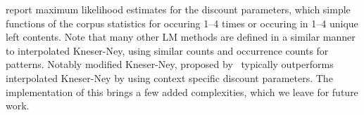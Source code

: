  report maximum likelihood estimates for the discount parameters, which simple functions of the corpus statistics for \ngrams occuring 1--4 times or occuring in 1--4 unique left contents. 
Note that many other LM methods are defined in a similar manner to interpolated Kneser-Ney, using similar counts and occurrence counts for \mgram patterns.
Notably modified Kneser-Ney, proposed by~ typically outperforms interpolated Kneser-Ney by using context specific discount parameters.
The implementation of this brings a few added complexities, which we leave for future work.


